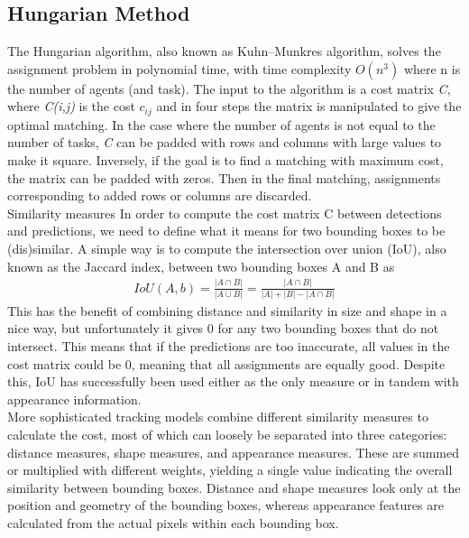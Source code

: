     \subsection{Hungarian Method}
        The Hungarian algorithm, also known as Kuhn–Munkres algorithm, solves the assignment problem in polynomial time, with time complexity \emph{$O(n^3)$} where n is the number of agents (and task). The input to the algorithm is a cost matrix \emph{C}, where \emph{C(i,j)} 
        is the cost $c_{ij}$ and in four steps the matrix is manipulated to give the optimal matching. In the case where the number of agents is not equal to the number of tasks, \emph{C} can be padded with rows and columns with large values to make it square. Inversely, 
        if the goal is to find a matching with maximum cost, the matrix can be padded with zeros. Then in the final matching, assignments corresponding to added rows or columns are discarded. \\ 
        \vspace{3mm}
        Similarity measures In order to compute the cost matrix C between detections and predictions, we need to define what it means for two bounding boxes to be (dis)similar. A simple way is to compute the intersection over union (IoU), also known as the Jaccard index, between 
        two bounding boxes A and B as
        \begin{align}
            IoU(A,b) = \frac{|A \cap B|}{|A \cup B|} = \frac{|A \cap B|}{|A| + |B| - |A \cap B|} 
        \end{align}
        This has the benefit of combining distance and similarity in size and shape in a nice way, but unfortunately it gives 0 for any two bounding boxes that do not intersect. This means that if the predictions are too inaccurate, all values in the cost matrix could be 0, 
        meaning that all assignments are equally good. Despite this, IoU has successfully been used either as the only measure or in tandem with appearance information. \\ 
        \vspace{3mm}
        More sophisticated tracking models combine different similarity measures to calculate the cost, most of which can loosely be separated into three categories: distance measures, shape measures, and appearance measures. These are summed or multiplied with different weights, 
        yielding a single value indicating the overall similarity between bounding boxes. Distance and shape measures look only at the position and geometry of the bounding boxes, whereas appearance features are calculated from the actual pixels within each bounding box. \\ 
